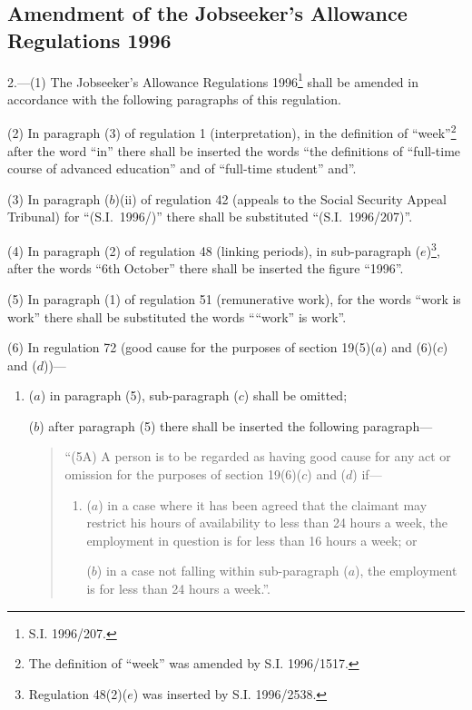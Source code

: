 \documentclass[12pt,a4paper]{article}
\begin{document}
\subsection[2. Amendment of the Jobseeker’s Allowance Regulations 1996]{Amendment of the Jobseeker’s Allowance Regulations 1996}

2.---(1)  The Jobseeker’s Allowance Regulations 1996\footnote{\frenchspacing S.I. 1996/207.} shall be amended in accordance with the following paragraphs of this regulation.

(2) In paragraph (3) of regulation 1 (interpretation), in the definition of “week”\footnote{\frenchspacing The definition of “week” was amended by S.I. 1996/1517.} after the word “in” there shall be inserted the words “the definitions of “full-time course of advanced education” and of “full-time student” and”.

(3) In paragraph ($b$)(ii)  of regulation 42 (appeals to the Social Security Appeal Tribunal) for “(S.I.\ 1996/)” there shall be substituted “(S.I.\ 1996/207)”.

(4) In paragraph (2) of regulation 48 (linking periods), in sub-paragraph ($e$)\footnote{\frenchspacing Regulation 48(2)($e$) was inserted by S.I. 1996/2538.}, after the words “6th October” there shall be inserted the figure “1996”.

(5) In paragraph (1) of regulation 51 (remunerative work), for the words “work is work” there shall be substituted the words ““work” is work”.

(6) In regulation 72 (good cause for the purposes of section 19(5)($a$)  and (6)($c$)  and ($d$))—
\begin{enumerate}\item[]
($a$) in paragraph (5), sub-paragraph ($c$)  shall be omitted;

($b$) after paragraph (5) there shall be inserted the following paragraph—
\begin{quotation}
“(5A) A person is to be regarded as having good cause for any act or omission for the purposes of section 19(6)($c$)  and ($d$)  if—
\begin{enumerate}\item[]
($a$) in a case where it has been agreed that the claimant may restrict his hours of availability to less than 24 hours a week, the employment in question is for less than 16 hours a week; or

($b$) in a case not falling within sub-paragraph ($a$), the employment is for less than 24 hours a week.”.
\end{enumerate}
\end{quotation}
\end{enumerate}
\end{document}
